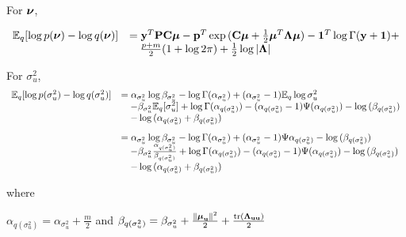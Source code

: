 \documentclass{amsart}[12pt]
\begin{document}
%
%
%
%

For ${\boldsymbol \nu}$,


$$
\begin{array}{ll}
{\mathbb E}_q[\log{p({\boldsymbol\nu})} - \log{q({\boldsymbol\nu})}] &= {\bf y}^T {\bf P} {\bf C} {\boldsymbol \mu} - {\bf p}^T \exp{({\bf C}{\boldsymbol\mu}+ {\frac{1}{2}}{\boldsymbol\mu}^T {\boldsymbol\Lambda}{\boldsymbol\mu})} - {\bf 1}^T\log \Gamma{({\bf y}+ {\bf1})} + \\
& \quad \frac{p + m}{2} (1 + \log{2 \pi}) + {\frac{1}{2}} \log{|{\boldsymbol\Lambda}|}
\end{array}
$$


For $\sigma^2_u$,
$$
\begin{array}{ll}
{\mathbb E}_q[\log{p(\sigma^2_u)} - \log{q(\sigma^2_u)}] &=
\alpha_{\sigma^2_u} \log{\beta_{\sigma^2_u}} - \log{\Gamma{(\alpha_{\sigma^2_u})}} +
(\alpha_{\sigma^2_u} - 1) {\mathbb E}_q	\log{\sigma^2_u}\\
& \quad - \beta_{\sigma^2_u} {\mathbb E}_q [\sigma^2_u] +
\log{\Gamma(\alpha_{q(\sigma^2_u)})} - (\alpha_{q(\sigma^2_u)} - 1) \Psi{(\alpha_{q(\sigma^2_u)})} - \log{(\beta_{q(\sigma^2_u)})}\\
& \quad - \log{(\alpha_{q(\sigma^2_u)} + \beta_{q(\sigma^2_u)})}\\ [2ex]
&=\alpha_{\sigma^2_u} \log{\beta_{\sigma^2_u}} - \log{\Gamma{(\alpha_{\sigma^2_u})}} +
(\alpha_{\sigma^2_u} - 1) \Psi{\alpha_{q(\sigma^2_u)}} - \log{(\beta_{q(\sigma^2_u)})} \\
& \quad - \beta_{\sigma^2_u} \frac{\alpha_{q(\sigma^2_u)}}{\beta_{q(\sigma^2_u)}} + 
\log{\Gamma(\alpha_{q(\sigma^2_u)})} - (\alpha_{q(\sigma^2_u)} - 1) \Psi{(\alpha_{q(\sigma^2_u)})} - \log{(\beta_{q(\sigma^2_u)})}\\
& \quad- \log{(\alpha_{q(\sigma^2_u)} + \beta_{q(\sigma^2_u)})}
\end{array}
$$

where

$\alpha_{q(\sigma^2_u)} = \alpha_{\sigma^2_u} + \frac{m}{2}$ and
$\beta_{q(\sigma^2_u)} = \beta_{\sigma^2_u} + \frac{\|{\boldsymbol \mu}_{\bf u}\|^2}{2} + \frac{\text{tr}{({\boldsymbol\Lambda}_{{\bf u}{\bf u}})}}{2}$
\end{document}
